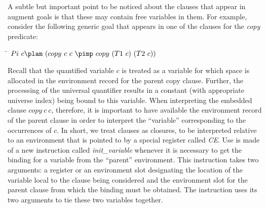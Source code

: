 A subtle but important point to be noticed about the clauses that
appear in augment goals is that these may contain free variables in
them. For example, consider the following generic goal that appears in
one of the clauses for the {\it copy} predicate:
\begin{tabbing}
\qquad\=\kill
\>$Pi\ c\plam \ (copy\ c\ c\ \pimp \ copy\ (T1\ c)\ (T2\ c))$
\end{tabbing}
Recall that the quantified variable $c$ is treated as a variable for
which space is allocated in the environment record for the parent copy
clause. Further, the processing of the universal quantifier results in
a constant (with appropriate universe index) being bound to this
variable. When interpreting the embedded clause $copy\ c\ c$,
therefore, it is important to have available the environment record of
the parent clause in order to interpret the ``variable'' corresponding
to the occurrences of $c$. In short, we treat clauses as closures, to
be interpreted relative to an environment that is pointed to by a
special register called {\it CE}. Use is made of a new instruction
called {\it init\_variable} whenever it is necessary to get the
binding for a variable from the ``parent'' environment. This
instruction takes two arguments: a register or an environment slot
designating the location of the variable local to the clause being
considered and the environment slot for the parent clause from which
the binding must be obtained. The instruction uses its two arguments
to tie these two variables together.

